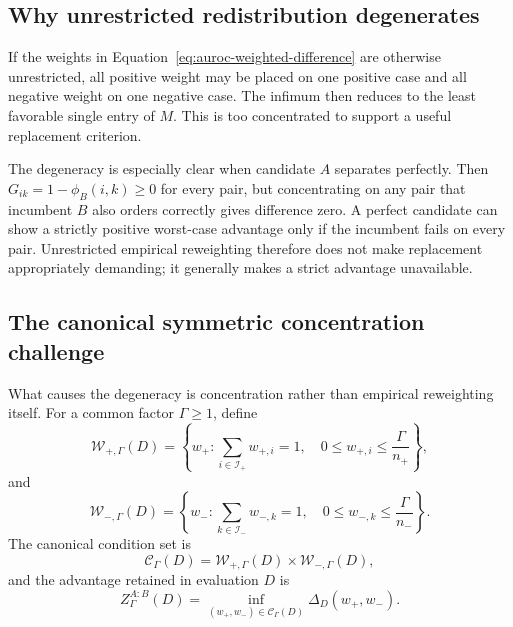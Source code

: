 \documentclass[11pt]{article}
\newcommand{\CSet}{\mathcal{C}}
\theoremstyle{remark}
\begin{document}
\subsection{Why unrestricted redistribution degenerates}

If the weights in Equation~\eqref{eq:auroc-weighted-difference} are otherwise
unrestricted, all positive weight may be placed on one positive case and all
negative weight on one negative case. The infimum then reduces to the least
favorable single entry of $M$. This is too concentrated to support a useful
replacement criterion.

The degeneracy is especially clear when candidate $A$ separates perfectly.
Then $G_{ik}=1-\phi_B(i,k)\geq0$ for every pair, but concentrating on any pair
that incumbent $B$ also orders correctly gives difference zero. A perfect
candidate can show a strictly positive worst-case advantage only if the
incumbent fails on every pair. Unrestricted empirical reweighting therefore
does not make replacement appropriately demanding; it generally makes a
strict advantage unavailable.

\subsection{The canonical symmetric concentration challenge}

What causes the degeneracy is concentration rather than empirical reweighting
itself. For a common factor $\Gamma\geq1$, define
\begin{equation}
\mathcal W_{+,\Gamma}(D)
=
\left\{
w_+:
\sum_{i\in\mathcal I_+}w_{+,i}=1,\quad
0\leq w_{+,i}\leq\frac{\Gamma}{n_+}
\right\},
\label{eq:auroc-positive-weights}
\end{equation}
and
\begin{equation}
\mathcal W_{-,\Gamma}(D)
=
\left\{
w_-:
\sum_{k\in\mathcal I_-}w_{-,k}=1,\quad
0\leq w_{-,k}\leq\frac{\Gamma}{n_-}
\right\}.
\label{eq:auroc-negative-weights}
\end{equation}
The canonical condition set is
\[
\CSet_\Gamma(D)
=
\mathcal W_{+,\Gamma}(D)\times\mathcal W_{-,\Gamma}(D),
\]
and the advantage retained in evaluation $D$ is
\begin{equation}
Z_\Gamma^{A:B}(D)
=
\inf_{(w_+,w_-)\in\CSet_\Gamma(D)}
\Delta_D(w_+,w_-).
\label{eq:auroc-z-gamma}
\end{equation}
\end{document}
